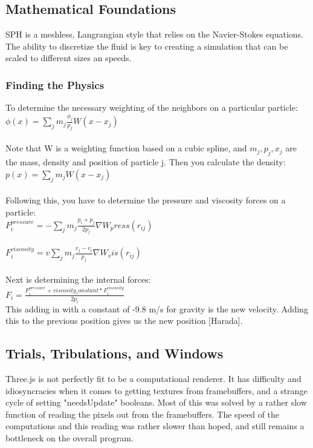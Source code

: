 \subsection{Mathematical Foundations}
SPH is a meshless, Langrangian style that relies on the Navier-Stokes equations.
The ability to discretize the fluid is key to creating a simulation that can be scaled
to different sizes an speeds.

\subsubsection{Finding the Physics}
To determine the necessary weighting of the neighbors on a particular particle: \\
$\phi(x) = \sum_j m_j \frac{\phi_j}{p_j}W(x - x_j)$ \\ \\
Note that W is a weighting function based on a cubic spline, and $m_j, p_j, x_j$ are the mass, density and position of particle j.
Then you calculate the density: \\
$p(x) = \sum_j m_j W(x - x_j)$ \\ \\
Following this, you have to determine the pressure and viscosity forces on a particle: \\
$F^{pressure}_i = -\sum_j m_j \frac{p_i + p_j}{2p_j}\nabla W_press(r_{ij})$ \\ \\
$F^{viscosity}_i = v\sum_j m_j \frac{v_j - v_i}{p_j}\nabla W_vis(r_{ij})$ \\ \\
Next is determining the internal forces: \\
$F_i = \frac{F^{pressure}_i + viscosity_constant * F^{viscosity}_i}{2p_i}$ \\
This adding in with a constant of -9.8 m/s for gravity is the new velocity. Adding this to the 
previous position gives us the new position [Harada].

\subsection{Trials, Tribulations, and Windows}
Three.js is not perfectly fit to be a computational renderer. It has difficulty and idiosyncracies when
it comes to getting textures from framebuffers, and a strange cycle of setting "needsUpdate" booleans.
Most of this was solved by a rather slow function of reading the pixels out from the framebuffers.
The speed of the computations and this reading was rather slower than hoped, and still remains a bottleneck
on the overall program. 

